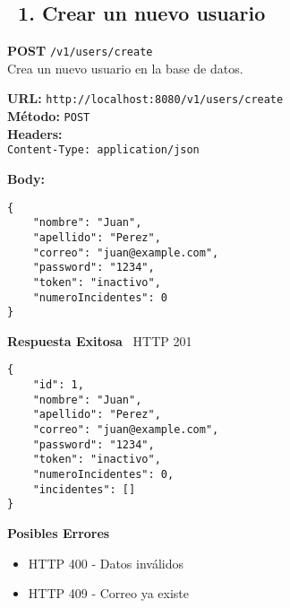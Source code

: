 \subsection*{\faServer\ 1. Crear un nuevo usuario}

\begin{tcolorbox}[endpoint]
    \textbf{POST} \texttt{/v1/users/create}\\
    Crea un nuevo usuario en la base de datos.
\end{tcolorbox}

\begin{tcolorbox}[request]
    \textbf{URL:} \textcolor{urlColor}{\texttt{http://localhost:8080/v1/users/create}}\\
    \textbf{Método:} \textcolor{methodColor}{\texttt{POST}}\\
    \textbf{Headers:}\\
    \textcolor{headerColor}{\texttt{Content-Type: application/json}}
    
    \textbf{Body:}
    \begin{verbatim}
{
    "nombre": "Juan",
    "apellido": "Perez",
    "correo": "juan@example.com",
    "password": "1234",
    "token": "inactivo",
    "numeroIncidentes": 0
}
    \end{verbatim}
\end{tcolorbox}

\begin{tcolorbox}[response]
    \textbf{Respuesta Exitosa} \faCheckCircle\ \textcolor{successColor}{HTTP 201}
    \begin{verbatim}
{
    "id": 1,
    "nombre": "Juan",
    "apellido": "Perez",
    "correo": "juan@example.com",
    "password": "1234",
    "token": "inactivo",
    "numeroIncidentes": 0,
    "incidentes": []
}
    \end{verbatim}
    
    \textbf{Posibles Errores} \faExclamationTriangle
    \begin{itemize}
        \item \textcolor{errorColor}{HTTP 400} - Datos inválidos
        \item \textcolor{errorColor}{HTTP 409} - Correo ya existe
    \end{itemize}
\end{tcolorbox}

